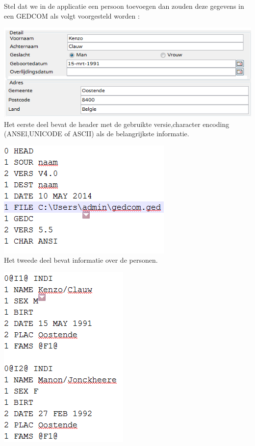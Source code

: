 \documentclass[pdftex,a4paper,12pt,twoside]{report}
\begin{document}
Stel dat we in de applicatie een persoon toevoegen dan zouden deze gegevens in een GEDCOM als volgt voorgesteld worden :

\includegraphics{images/gedcom.png}\\

Het eerste deel bevat de header met de gebruikte versie,character encoding (ANSEl,UNICODE of ASCII) als de belangrijkste informatie.


\includegraphics{images/gedcomheader.png}\\

Het tweede deel bevat informatie over de personen.

\includegraphics{images/gedcomperson.png}\\
\end{document}
